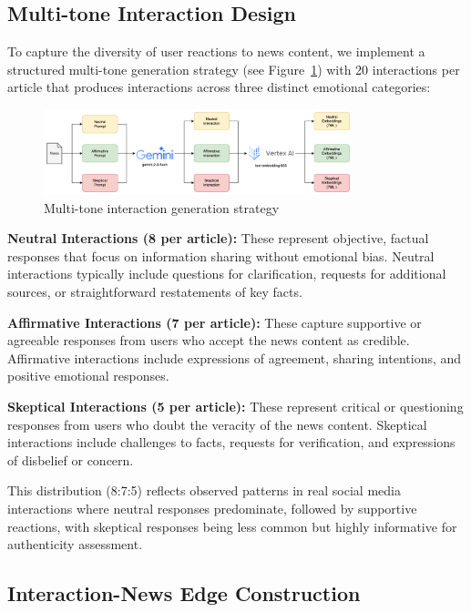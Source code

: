 \subsection{Multi-tone Interaction Design}

To capture the diversity of user reactions to news content, we implement a structured multi-tone generation strategy (see Figure~\ref{fig:interaction-generation}) with 20 interactions per article that produces interactions across three distinct emotional categories:

\begin{figure}[h]
    \centering
    \includegraphics[width=0.8\textwidth]{context/methodology/fig/user_interaction_generation.png}
    \caption{Multi-tone interaction generation strategy}
    \label{fig:interaction-generation}
\end{figure}

\textbf{Neutral Interactions (8 per article):} These represent objective, factual responses that focus on information sharing without emotional bias. Neutral interactions typically include questions for clarification, requests for additional sources, or straightforward restatements of key facts.

\textbf{Affirmative Interactions (7 per article):} These capture supportive or agreeable responses from users who accept the news content as credible. Affirmative interactions include expressions of agreement, sharing intentions, and positive emotional responses.

\textbf{Skeptical Interactions (5 per article):} These represent critical or questioning responses from users who doubt the veracity of the news content. Skeptical interactions include challenges to facts, requests for verification, and expressions of disbelief or concern.

This distribution (8:7:5) reflects observed patterns in real social media interactions where neutral responses predominate, followed by supportive reactions, with skeptical responses being less common but highly informative for authenticity assessment.

\subsection{Interaction-News Edge Construction}

